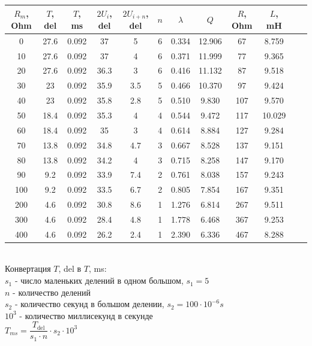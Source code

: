 \documentclass[12pt,a4paper]{report}
\begin{document}
\begin{tabular}{|c|c|c|c|c|c|c|c|c|c|c|c|}
    \hline
    $R_m$, Ohm & $T$, del & $T$, ms & $2U_i$, del & $2U_{i+n}$, del & $n$ & $\lambda$ & $Q$ & $R$, Ohm & $L$, mH \\
    \hline
    0 & 27.6 & 0.092 & 37 & 5 & 6 & 0.334 & 12.906 & 67 & 8.759 \\
    \hline
    10 & 27.6 & 0.092 & 37 & 4 & 6 & 0.371 & 11.999 & 77 & 9.365 \\
    \hline
    20 & 27.6 & 0.092 & 36.3 & 3 & 6 & 0.416 & 11.132 & 87 & 9.518 \\
    \hline
    30 & 23 & 0.092 & 35.9 & 3.5 & 5 & 0.466 & 10.370 & 97 & 9.424 \\
    \hline
    40 & 23 & 0.092 & 35.8 & 2.8 & 5 & 0.510 & 9.830 & 107 & 9.570 \\
    \hline
    50 & 18.4 & 0.092 & 35.3 & 4 & 4 & 0.544 & 9.472 & 117 & 10.029 \\
    \hline
    60 & 18.4 & 0.092 & 35 & 3 & 4 & 0.614 & 8.884 & 127 & 9.284 \\
    \hline
    70 & 13.8 & 0.092 & 34.8 & 4.7 & 3 & 0.667 & 8.528 & 137 & 9.151 \\
    \hline
    80 & 13.8 & 0.092 & 34.2 & 4 & 3 & 0.715 & 8.258 & 147 & 9.170 \\
    \hline
    90 & 9.2 & 0.092 & 33.9 & 7.4 & 2 & 0.761 & 8.038 & 157 & 9.243 \\
    \hline
    100 & 9.2 & 0.092 & 33.5 & 6.7 & 2 & 0.805 & 7.854 & 167 & 9.351 \\
    \hline
    200 & 4.6 & 0.092 & 30.8 & 8.6 & 1 & 1.276 & 6.814 & 267 & 9.511 \\
    \hline
    300 & 4.6 & 0.092 & 28.4 & 4.8 & 1 & 1.778 & 6.468 & 367 & 9.253 \\
    \hline
    400 & 4.6 & 0.092 & 26.2 & 2.4 & 1 & 2.390 & 6.336 & 467 & 8.288 \\
    \hline
\end{tabular}\\
\hfill\break
Конвертация $T$, del в $T$, ms: \\
$s_1$ - число маленьких делений в одном большом, $s_1=5$ \\
$n$ - количество делений \\
$s_2$ - количество секунд в большом делении, $s_2=100\cdot10^{-6}s$ \\
$10^3$ - количество миллисекунд в секунде \\
\hfill\break
$T_{ms}=\dfrac{T_\text{del}}{s_1\cdot n}\cdot s_2\cdot10^3$ \\
\end{document}
